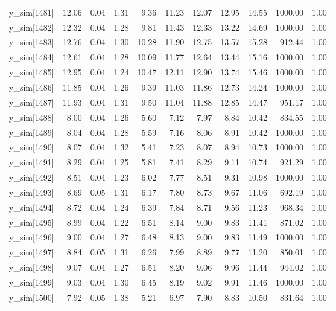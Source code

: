 \begin{table}[ht]
\begin{tabular}{rrrrrrrrrrr}
  y\_sim[1481] & 12.06 & 0.04 & 1.31 & 9.36 & 11.23 & 12.07 & 12.95 & 14.55 & 1000.00 & 1.00 \\ 
  y\_sim[1482] & 12.32 & 0.04 & 1.28 & 9.81 & 11.43 & 12.33 & 13.22 & 14.69 & 1000.00 & 1.00 \\ 
  y\_sim[1483] & 12.76 & 0.04 & 1.30 & 10.28 & 11.90 & 12.75 & 13.57 & 15.28 & 912.44 & 1.00 \\ 
  y\_sim[1484] & 12.61 & 0.04 & 1.28 & 10.09 & 11.77 & 12.64 & 13.44 & 15.16 & 1000.00 & 1.00 \\ 
  y\_sim[1485] & 12.95 & 0.04 & 1.24 & 10.47 & 12.11 & 12.90 & 13.74 & 15.46 & 1000.00 & 1.00 \\ 
  y\_sim[1486] & 11.85 & 0.04 & 1.26 & 9.39 & 11.03 & 11.86 & 12.73 & 14.24 & 1000.00 & 1.00 \\ 
  y\_sim[1487] & 11.93 & 0.04 & 1.31 & 9.50 & 11.04 & 11.88 & 12.85 & 14.47 & 951.17 & 1.00 \\ 
  y\_sim[1488] & 8.00 & 0.04 & 1.26 & 5.60 & 7.12 & 7.97 & 8.84 & 10.42 & 834.55 & 1.00 \\ 
  y\_sim[1489] & 8.04 & 0.04 & 1.28 & 5.59 & 7.16 & 8.06 & 8.91 & 10.42 & 1000.00 & 1.00 \\ 
  y\_sim[1490] & 8.07 & 0.04 & 1.32 & 5.41 & 7.23 & 8.07 & 8.94 & 10.73 & 1000.00 & 1.00 \\ 
  y\_sim[1491] & 8.29 & 0.04 & 1.25 & 5.81 & 7.41 & 8.29 & 9.11 & 10.74 & 921.29 & 1.00 \\ 
  y\_sim[1492] & 8.51 & 0.04 & 1.23 & 6.02 & 7.77 & 8.51 & 9.31 & 10.98 & 1000.00 & 1.00 \\ 
  y\_sim[1493] & 8.69 & 0.05 & 1.31 & 6.17 & 7.80 & 8.73 & 9.67 & 11.06 & 692.19 & 1.00 \\ 
  y\_sim[1494] & 8.72 & 0.04 & 1.24 & 6.39 & 7.84 & 8.71 & 9.56 & 11.23 & 968.34 & 1.00 \\ 
  y\_sim[1495] & 8.99 & 0.04 & 1.22 & 6.51 & 8.14 & 9.00 & 9.83 & 11.41 & 871.02 & 1.00 \\ 
  y\_sim[1496] & 9.00 & 0.04 & 1.27 & 6.48 & 8.13 & 9.00 & 9.83 & 11.49 & 1000.00 & 1.00 \\ 
  y\_sim[1497] & 8.84 & 0.05 & 1.31 & 6.26 & 7.99 & 8.89 & 9.77 & 11.20 & 850.01 & 1.00 \\ 
  y\_sim[1498] & 9.07 & 0.04 & 1.27 & 6.51 & 8.20 & 9.06 & 9.96 & 11.44 & 944.02 & 1.00 \\ 
  y\_sim[1499] & 9.03 & 0.04 & 1.30 & 6.45 & 8.19 & 9.02 & 9.91 & 11.46 & 1000.00 & 1.00 \\ 
  y\_sim[1500] & 7.92 & 0.05 & 1.38 & 5.21 & 6.97 & 7.90 & 8.83 & 10.50 & 831.64 & 1.00 \\ 

\end{tabular}
\end{table}
